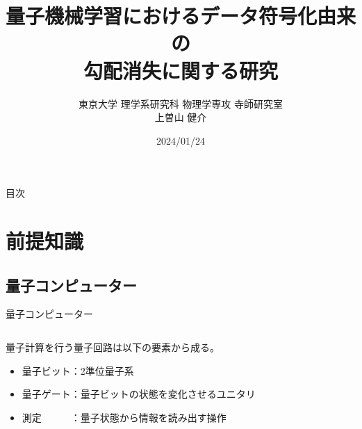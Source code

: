 \documentclass[dvipdfmx,10pt,aspectratio=169]{beamer}
\title{量子機械学習におけるデータ符号化由来の\\勾配消失に関する研究}
\author{東京大学 理学系研究科 物理学専攻 寺師研究室 \\上曽山 健介}
\date{2024/01/24}
\begin{document}
\frame{\titlepage}

\begin{frame}{目次}
    \tableofcontents
\end{frame}



\section{前提知識}
\subsection{量子コンピューター}
\begin{frame}{量子コンピューター}
    \begin{center}
        {\large\colorbox{blue!40}{}}
    \end{center}
    \begin{columns}
        \begin{column}{0.7\textwidth}
            量子計算を行う量子回路は以下の要素から成る。
            \begin{itemize}
                \item 量子ビット：2準位量子系
                \item 量子ゲート：量子ビットの状態を変化させるユニタリ
                \item 測定　　　：量子状態から情報を読み出す操作
            \end{itemize}
        \end{column}

        \begin{column}{0.3\textwidth}
        \end{column}
    \end{columns}


\end{frame}
\end{document}
